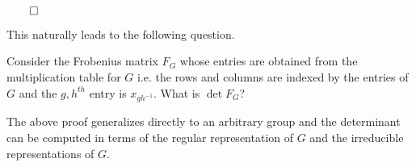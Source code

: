 \begin{flushright}
	$\qed$
\end{flushright}
This naturally leads to the following question.
\begin{ques}
	Consider the Frobenius matrix $F_G$ whose entries are obtained from the multiplication table for $G$ i.e. the rows and columns are indexed by the entries of $G$ and the $g,h^{th}$ entry is $x_{gh^{-1}}$. What is $\det F_G$?
\end{ques}
The above proof generalizes directly to an arbitrary group and the determinant can be computed in terms of the regular representation of $G$ and the irreducible representations of $G$.













\iffalse
\subsection{Standard representation of $S_n$}
As we saw earlier the standard representation of $S_n$ breaks down into two representations $W \oplus W^{\perp}$ where $W$ is the 1 dimensional vectors space spanned by $e_1 + \cdots + e_n$ and $W^{\perp}$ is the perpendicular vector space consisting of vectors of the form $\{ c_1 e_1 + \cdots + c_n e_n : c_1 + \cdots + c_n = 0\}$
As we saw earlier the standard representation of $S_n$ breaks down into two representations $W \oplus W^{\perp}$ where $W$ is the 1 dimensional vectors space spanned by $e_1 + \cdots + e_n$ and $W^{\perp}$ is the perpendicular vector space consisting of vectors of the form $\{ c_1 e_1 + \cdots + c_n e_n : c_1 + \cdots + c_n = 0\}$
\begin{proposition}
	\begin{align}
		\dfrac{1}{n!}\sum\limits_{\sigma \in S_n} (\mbox{number of fixed points of } \sigma)^2 = 2
	\end{align}
\end{proposition}
\fi







